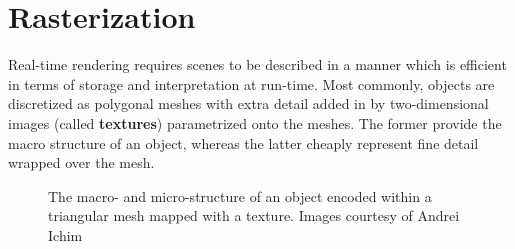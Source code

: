 \section{Rasterization}

Real-time rendering requires scenes to be described in a manner which is efficient in terms of storage and interpretation at run-time. Most commonly, objects are discretized as polygonal meshes with extra detail added in by two-dimensional images (called \textbf{textures}) parametrized onto the meshes. The former provide the macro structure of an object, whereas the latter cheaply represent fine detail wrapped over the mesh.

\begin{figure}[ht!]
  \centering
  \caption{The macro- and micro-structure of an object encoded within a triangular mesh mapped with a texture. Images courtesy of Andrei Ichim}
  \label{fig:PostApCar}
\end{figure}

